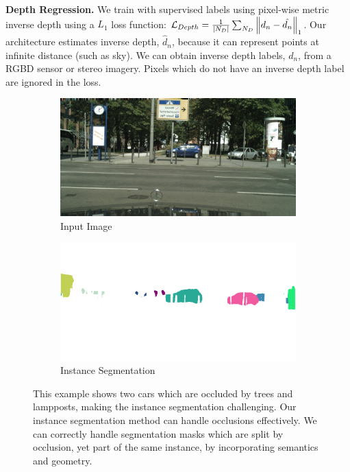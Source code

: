 \textbf{Depth Regression.}
We train with supervised labels using pixel-wise metric inverse depth using a $L_1$ loss function: $\mathcal{L}_{Depth} = \frac{1}{|N_D|} \sum_{N_D} \left\lVert d_n-\hat{d_n} \right\rVert_1$. Our architecture estimates inverse depth, $\hat{d}_n$, because it can represent points at infinite distance (such as sky). We can obtain inverse depth labels, $d_n$, from a RGBD sensor or stereo imagery. Pixels which do not have an inverse depth label are ignored in the loss.


\begin{figure}[t]
\begin{center}
\begin{subfigure}[t]{0.49\linewidth}
  \includegraphics[width=\linewidth,trim={350px 120px 0 100px},clip]{example_instance/segnet_19_output_0.jpg}
  \caption{Input Image}
\end{subfigure}
\begin{subfigure}[t]{0.49\linewidth}
  \includegraphics[width=\linewidth,trim={350px 120px 0 100px},clip]{example_instance/segnet_19_output_3.png}
  \caption{Instance Segmentation}
\end{subfigure}
\end{center}
   \caption[Instance segmentation with occlusion.]{This example shows two cars which are occluded by trees and lampposts, making the instance segmentation challenging. Our instance segmentation method can handle occlusions effectively. We can correctly handle segmentation masks which are split by occlusion, yet part of the same instance, by incorporating semantics and geometry.}
\label{fig:instancemask}
\end{figure}


